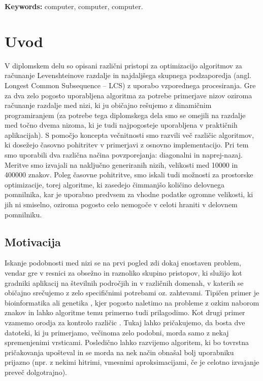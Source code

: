 \documentclass[a4paper,12pt,openright]{book}
\newcommand{\tkeywordsEn}{computer, computer, computer}
\newcommand{\clearemptydoublepage}{\newpage{\pagestyle{empty}\cleardoublepage}}
\begin{document}
\bigskip

\noindent\textbf{Keywords:} \tkeywordsEn.
\clearemptydoublepage

\mainmatter
\setcounter{page}{1}
\pagestyle{fancy}

\chapter{Uvod}

V diplomskem delu so opisani različni pristopi za optimizacijo algoritmov za računanje Levenshteinove razdalje in najdaljšega skupnega podzaporedja (angl. Longest Common Subsequence -- LCS) z uporabo vzporednega procesiranja. Gre za dva zelo pogosto uporabljena algoritma za potrebe primerjave nizov oziroma računanje razdalje med nizi, ki ju običajno rešujemo z dinamičnim programiranjem (za potrebe tega diplomskega dela smo se omejili na razdalje med točno dvema nizoma, ki je tudi najpogosteje uporabljena v praktičnih aplikacijah). S pomočjo koncepta večnitnosti smo razvili več različic algoritmov, ki dosežejo časovno pohitritev v primerjavi z osnovno implementacijo. Pri tem smo uporabili dva različna načina povzporejanja: diagonalni in naprej-nazaj. Meritve smo izvajali na naključno generiranih nizih, velikosti med 10000 in 400000 znakov. Poleg časovne pohitritve, smo iskali tudi možnosti za prostorske optimizacije, torej algoritme, ki zasedejo čimmanjšo količino delovnega pomnilnika, kar je uporabno predvsem za vhodne podatke ogromne velikosti, ki jih ni smiselno, oziroma pogosto celo nemogoče v celoti hraniti v delovnem pomnilniku. 

\section{Motivacija}

Iskanje podobnosti med nizi se na prvi pogled zdi dokaj enostaven problem, vendar gre v resnici za obsežno in raznoliko skupino pristopov, ki služijo kot gradniki aplikacij na številnih področjih in v različnih domenah, v katerih se običajno srečujemo z zelo specifičnimi potrebami oz. zahtevami. Tipičen primer je bioinformatika ali genetika \cite{LCSpracticalUse}, kjer pogosto naletimo na probleme z ozkim naborom znakov in lahko algoritme temu primerno tudi prilagodimo. Kot drugi primer vzamemo orodja za kontrolo različic \cite{levenshteinMotivation}. Tukaj lahko pričakujemo, da bosta dve datoteki, ki ju primerjamo, večinoma zelo podobni, morda samo z nekaj spremenjenimi vrsticami. Posledično lahko razvijemo algoritem, ki bo tovrstna pričakovanja upošteval in se morda na nek način obnašal bolj uporabniku prijazno (npr. z nekimi hitrimi, vmesnimi aproksimacijami, če je celotno izvajanje preveč dolgotrajno). 
\end{document}
